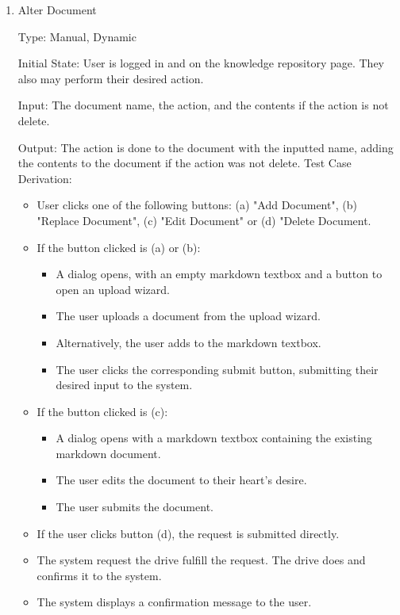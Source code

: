 \documentclass[12pt, titlepage]{article}
\begin{document}
\begin{enumerate}

\item{Alter Document\\}

Type: Manual, Dynamic
					
Initial State: User is logged in and on the knowledge repository page. They also may perform their desired action.
					
Input: The document name, the action, and the contents if the action is not delete.
					
Output: The action is done to the document with the inputted name, adding the contents to the document if the action was not delete.
Test Case Derivation: 

\begin{itemize}
  \item User clicks one of the following buttons: (a) "Add Document", (b) "Replace Document", (c) "Edit Document" or (d) "Delete Document.
  \item If the button clicked is (a) or (b):
  \begin{itemize}
    \item A dialog opens, with an empty markdown textbox and a button to open an upload wizard.
    \item The user uploads a document from the upload wizard. 
    \item Alternatively, the user adds to the markdown textbox.
    \item The user clicks the corresponding submit button, submitting their desired input to the system.
  \end{itemize}
  \item If the button clicked is (c):
  \begin{itemize}
      \item A dialog opens with a markdown textbox containing the existing markdown document.
      \item The user edits the document to their heart's desire.
      \item The user submits the document.
  \end{itemize}
  \item If the user clicks button (d), the request is submitted directly.
  \item The system request the drive fulfill the request. The drive does and confirms it to the system.
  \item The system displays a confirmation message to the user.
\end{itemize}


\end{enumerate}
\end{document}
